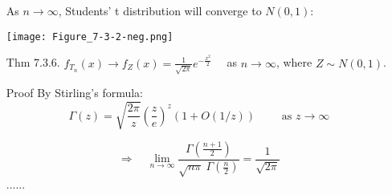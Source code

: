 \begin{frame}
\begin{enumerate}
\item[] As $n\rightarrow \infty$, Students' t distribution will converge to $N(0,1)$: \\
	\begin{center}
		\texttt{[image: Figure\_7-3-2-neg.png]}
	\end{center}
\vfill
\item[Thm \small 7.3.6.] $\displaystyle f_{T_n}(x)\rightarrow f_Z(x)= \frac{1}{\sqrt{2\pi}}e^{- \frac{x^2}{2}}\quad $ as $n\rightarrow\infty$, where $Z\sim N(0,1)$.
	\vfill
\item[Proof] By Stirling's formula:
	\[\Gamma(z) =\sqrt{ \frac{2\pi}{z}}\left( \frac{z}{e}\right)^z \left( 1+O(1/z) \right)
		\qquad\text{	as $z\rightarrow\infty$}
	\]
\item[]
	\[
		\Longrightarrow \quad \lim_{n\rightarrow\infty}  \frac{\Gamma\left(  \frac{n+1}{2} \right)}{\sqrt{n \pi}\: \Gamma\left(  \frac{n}{2} \right) } =  \frac{1}{\sqrt{2\pi}}
	\]
	......
	\myEnd
\end{enumerate}
\end{frame}

